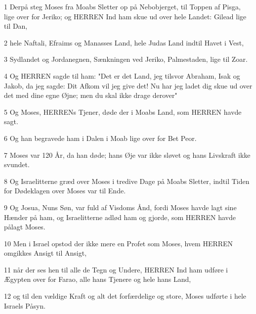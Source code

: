 \par 1 Derpå steg Moses fra Moabs Sletter op på Nebobjerget, til Toppen af Pisga, lige over for Jeriko; og HERREN Ind ham skue ud over hele Landet: Gilead lige til Dan,
\par 2 hele Naftali, Efraims og Manasses Land, hele Judas Land indtil Havet i Vest,
\par 3 Sydlandet og Jordanegnen, Sænkningen ved Jeriko, Palmestaden, lige til Zoar.
\par 4 Og HERREN sagde til ham: "Det er det Land, jeg tilsvor Abraham, Isak og Jakob, da jeg sagde: Dit Afkom vil jeg give det! Nu har jeg ladet dig skue ud over det med dine egne Øjne; men du skal ikke drage derover"
\par 5 Og Moses, HERRENs Tjener, døde der i Moabs Land, som HERREN havde sagt.
\par 6 Og han begravede ham i Dalen i Moab lige over for Bet Peor.
\par 7 Moses var 120 År, da han døde; hans Øje var ikke sløvet og hans Livskraft ikke svundet.
\par 8 Og Israelitterne græd over Moses i tredive Dage på Moabs Sletter, indtil Tiden for Dødeklagen over Moses var til Ende.
\par 9 Og Josua, Nuns Søn, var fuld af Visdoms Ånd, fordi Moses havde lagt sine Hænder på ham, og Israelitterne adlød ham og gjorde, som HERREN havde pålagt Moses.
\par 10 Men i Israel opstod der ikke mere en Profet som Moses, hvem HERREN omgikkes Ansigt til Ansigt,
\par 11 når der ses hen til alle de Tegn og Undere, HERREN Ind ham udføre i Ægypten over for Farao, alle hans Tjenere og hele hans Land,
\par 12 og til den vældige Kraft og alt det forfærdelige og store, Moses udførte i hele Israels Påsyn.



